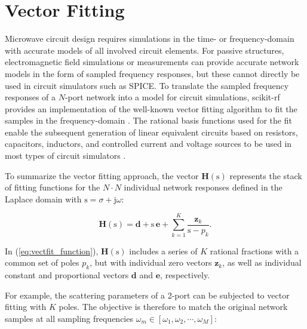 \documentclass{IEEEjmw}
\begin{document}
\section{Vector Fitting}
Microwave circuit design requires simulations in the time- or frequency-domain with accurate models of all involved circuit elements. For passive structures, electromagnetic field simulations or measurements can provide accurate network models in the form of sampled frequency responses, but these cannot directly be used in circuit simulators such as SPICE. To translate the sampled frequency responses of a $N$-port network into a model for circuit simulations, scikit-rf provides an implementation of the well-known vector fitting algorithm to fit the samples in the frequency-domain \cite{vectfit}. The rational basis functions used for the fit enable the subsequent generation of linear equivalent circuits based on resistors, capacitors, inductors, and controlled current and voltage sources to be used in most types of circuit simulators \cite{vectfit_spice}. 

To summarize the vector fitting approach, the vector $\mathbf{H}(\mathrm{s})$ represents the stack of fitting functions for the $N \cdot N$ individual network responses defined in the Laplace domain with $\mathrm{s} = \sigma + \mathrm{j} \omega$:

\begin{equation}
\mathbf{H}(\mathrm{s}) = \mathbf{d} + \mathrm{s} \, \mathbf{e} + \sum _{k=1} ^{K} \frac{\mathbf{z}_k}{\mathrm{s} - p_k}.
\label{eq:vectfit_function}
\end{equation}

In (\ref{eq:vectfit_function}), $\mathbf{H}(\mathrm{s})$ includes a series of $K$ rational fractions with a common set of poles $p_k$, but with individual zero vectors $\mathbf{z}_{k}$, as well as individual constant and proportional vectors $\mathbf{d}$ and $\mathbf{e}$, respectively.

For example, the scattering parameters of a 2-port can be subjected to vector fitting with $K$ poles. The objective is therefore to match the original network samples at all sampling frequencies $\omega_m \in [\omega_1, \omega_2, \cdots, \omega_M]$:
\end{document}
